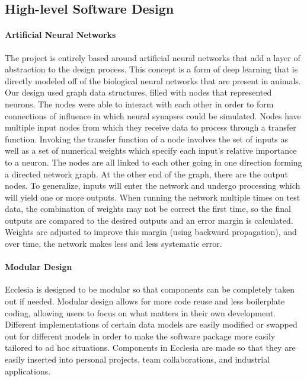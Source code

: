 \documentclass[letterpaper, 10pt]{article}
\begin{document}
	\subsection{High-level Software Design}
		\paragraph{Artificial Neural Networks}
		The project is entirely based around artificial neural networks that add a layer of abstraction to the design process. This concept is a form of deep learning that is directly modeled off of the biological neural networks that are present in animals. Our design used graph data structures, filled with nodes that represented neurons. The nodes were able to interact with each other in order to form connections of influence in which neural synapses could be simulated. Nodes have multiple input nodes from which they receive data to process through a transfer function. Invoking the transfer function of a node involves the set of inputs as well as a set of numerical weights which specify each input's relative importance to a neuron. The nodes are all linked to each other going in one direction forming a directed network graph. At the other end of the graph, there are the output nodes. To generalize, inputs will enter the network and undergo processing which will yield one or more outputs. When running the network multiple times on test data, the combination of weights may not be correct the first time, so the final outputs are compared to the desired outputs and an error margin is calculated. Weights are adjusted to improve this margin (using backward propagation), and over time, the network makes less and less systematic error.
		\clearpage
		\paragraph{Modular Design}
		Ecclesia is designed to be modular so that components can be completely taken out if needed. Modular design allows for more code reuse and less boilerplate coding, allowing users to focus on what matters in their own development. Different implementations of certain data models are easily modified or swapped out for different models in order to make the software package more easily tailored to ad hoc situations. Components in Ecclesia are made so that they are easily inserted into personal projects, team collaborations, and industrial applications.
\end{document}
